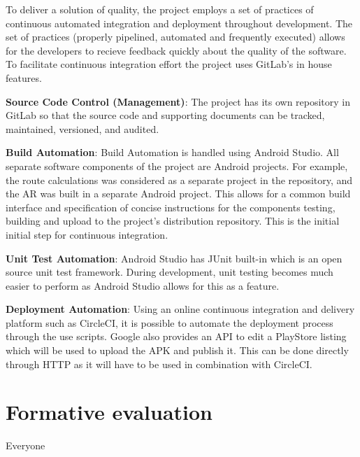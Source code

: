 To deliver a solution of quality, the project employs a set of practices of continuous automated integration and deployment throughout development. The set of practices (properly pipelined, automated and frequently executed) allows for the developers to recieve feedback quickly about the quality of the software. To facilitate continuous integration effort the project uses GitLab's in house features.

\textbf{Source Code Control (Management)}: The project has its own repository in GitLab so that the source code and supporting documents can be tracked, maintained, versioned, and audited.

\textbf{Build Automation}: Build Automation is handled using Android Studio. All separate software components of the project are Android projects. For example, the route calculations was considered as a separate project in the repository, and the AR was built in a separate Android project. This allows for a common build interface and specification of concise instructions for the components testing, building and upload to the project's distribution repository. This is the initial initial step for continuous integration.

\textbf{Unit Test Automation}: Android Studio has JUnit built-in which is an open source unit test framework. During development, unit testing becomes much easier to perform as Android Studio allows for this as a feature.

\textbf{Deployment Automation}: Using an online continuous integration and delivery platform such as CircleCI, it is possible to automate the deployment process through the use scripts. Google also provides an API to edit a PlayStore listing which will be used to upload the APK and publish it. This can be done directly through HTTP as it will have to be used in combination with CircleCI.

\section{Formative evaluation}
Everyone

